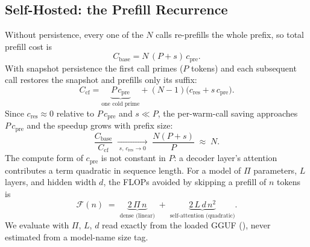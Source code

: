 \documentclass[10pt]{article}
\begin{document}
\subsection{Self-Hosted: the Prefill Recurrence}
Without persistence, every one of the $N$ calls re-prefills the whole prefix,
so total prefill cost is
\begin{equation}
C_{\text{base}} = N\,(P+s)\,c_{\text{pre}}.
\label{eq:base}
\end{equation}
With snapshot persistence the first call primes ($P$ tokens) and each subsequent
call restores the snapshot and prefills only its suffix:
\begin{equation}
C_{\text{cf}} = \underbrace{P\,c_{\text{pre}}}_{\text{one cold prime}}
   + (N\!-\!1)\big(c_{\text{res}} + s\,c_{\text{pre}}\big).
\label{eq:cf}
\end{equation}
Since $c_{\text{res}}\!\approx\!0$ relative to $P\,c_{\text{pre}}$ and
$s\ll P$, the per-warm-call saving approaches $P\,c_{\text{pre}}$ and the
speedup grows with prefix size:
\begin{equation}
\frac{C_{\text{base}}}{C_{\text{cf}}}
   \;\xrightarrow[\;s,\,c_{\text{res}}\to 0\;]{}\;
   \frac{N(P+s)}{P} \;\approx\; N .
\label{eq:speedup}
\end{equation}
The compute form of $c_{\text{pre}}$ is not constant in $P$: a decoder layer's
attention contributes a term quadratic in sequence length. For a model of $\Pi$
parameters, $L$ layers, and hidden width $d$, the FLOPs avoided by skipping a
prefill of $n$ tokens is
\begin{equation}
\mathcal{F}(n) \;=\; \underbrace{2\,\Pi\,n}_{\text{dense (linear)}}
   \;+\; \underbrace{2\,L\,d\,n^{2}}_{\text{self-attention (quadratic)}} .
\label{eq:flops}
\end{equation}
We evaluate  with $\Pi$, $L$, $d$ read exactly from the loaded
GGUF (), never estimated from a model-name size tag.
\end{document}
